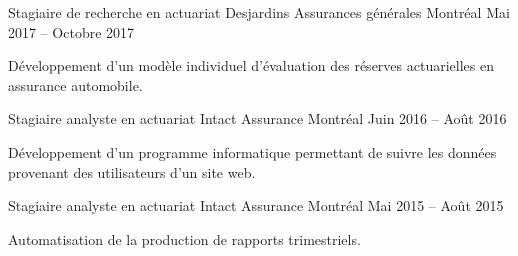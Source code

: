 \begin{cventries}
  \cventry
    {Stagiaire de recherche en actuariat} %
    {Desjardins Assurances générales} %
    {Montréal} %
    {Mai 2017 -- Octobre 2017} %
    {
      \begin{cvitems} %
        \item {Développement d'un modèle individuel d'évaluation des réserves actuarielles en assurance automobile.}
      \end{cvitems}
    }

  \cventry
    {Stagiaire analyste en actuariat}%
    {Intact Assurance} %
    {Montréal} %
    {Juin 2016 -- Août 2016} %
    {
      \begin{cvitems} %
        \item {Développement d'un programme informatique permettant de suivre les données provenant des utilisateurs d'un site web.}
      \end{cvitems}
    }
    
  \cventry
    {Stagiaire analyste en actuariat}%
    {Intact Assurance} %
    {Montréal} %
    {Mai 2015 -- Août 2015} %
    {
      \begin{cvitems} %
        \item {Automatisation de la production de rapports trimestriels.}
      \end{cvitems}
    }
  
\end{cventries}
